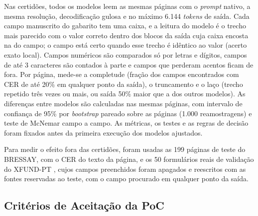 \documentclass[12pt,a4paper]{article}
\begin{document}
Nas certidões, todos os modelos leem as mesmas páginas com o \emph{prompt} nativo, a mesma resolução, decodificação gulosa e no máximo 6.144 \emph{tokens} de saída. Cada campo manuscrito do gabarito tem uma caixa, e a leitura do modelo é o trecho mais parecido com o valor correto dentro dos blocos da saída cuja caixa encosta na do campo; o campo está certo quando esse trecho é idêntico ao valor (acerto exato local). Campos numéricos são comparados só por letras e dígitos, campos de até 3 caracteres são contados à parte e campos que perderam acentos ficam de fora. Por página, mede-se a completude (fração dos campos encontrados com CER de até 20\% em qualquer ponto da saída), o truncamento e o laço (trecho repetido três vezes ou mais, ou saída 50\% maior que a dos outros modelos). As diferenças entre modelos são calculadas nas mesmas páginas, com intervalo de confiança de 95\% por \emph{bootstrap} pareado sobre as páginas (1.000 reamostragens) e teste de McNemar campo a campo. As métricas, os testes e as regras de decisão foram fixados antes da primeira execução dos modelos ajustados.

Para medir o efeito fora das certidões, foram usadas as 199 páginas de teste do BRESSAY, com o CER do texto da página, e os 50 formulários reais de validação do XFUND-PT \cite{xfund2022}, cujos campos preenchidos foram apagados e reescritos com as fontes reservadas ao teste, com o campo procurado em qualquer ponto da saída.

\subsection{Critérios de Aceitação da PoC}
\end{document}
